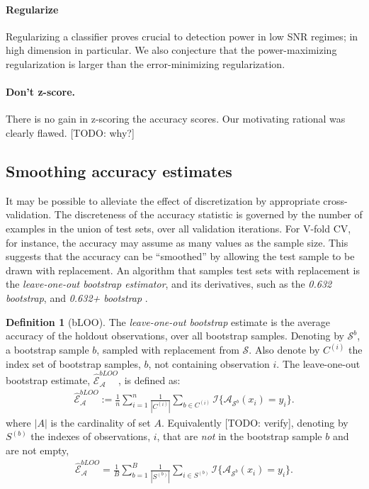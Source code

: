 \documentclass[12pt,a4paper]{article}
\theoremstyle{definition}
\newtheorem{definition}{Definition}
\newcommand{\set}[1]{\{ #1 \}} %
\newcommand{\indicator}[1]{\mathcal{I}{\set{#1}}} %
\newcommand{\features}{x} %
\newcommand{\outcomes}{y} %
\newcommand{\accEstim}{\hat{\mathcal{E}}}
\newcommand{\hypFun}[2]{\algo_{#1}(#2)} %
\newcommand{\algo}{\mathcal{A}}
\newcommand{\data}{\mathcal{S}}
\begin{document}
\paragraph{Regularize}
Regularizing a classifier proves crucial to detection power in low SNR regimes; in high dimension in particular. 
We also conjecture that the power-maximizing regularization is larger than the error-minimizing regularization. 

\paragraph{Don't z-score.} There is no gain in z-scoring the accuracy scores. Our motivating rational was clearly flawed. [TODO: why?]






\subsection{Smoothing accuracy estimates}
\label{sec:bootstrap}
It may be possible to alleviate the effect of discretization by appropriate cross-validation. 
The discreteness of the accuracy statistic is governed by the number of examples in the union of test sets, over all validation iterations.
For V-fold CV, for instance, the accuracy may assume as many values as the sample size. 
This suggests that the accuracy can be ``smoothed'' by allowing the test sample to be drawn with replacement. 
An algorithm that samples test sets with replacement is the \emph{leave-one-out bootstrap estimator},  and its derivatives, such as the \emph{0.632 bootstrap}, and \emph{0.632+ bootstrap} \citep[Sec 7.11]{hastie_elements_2003}.
\begin{definition}[bLOO]
\label{def:bloo}
The \emph{leave-one-out bootstrap} estimate is the average accuracy of the holdout observations, over all bootstrap samples. 
Denoting by $\data^b$, a bootstrap sample $b$, sampled with replacement from $\data$. 
Also denote by $C^{(i)}$ the index set of bootstrap samples, $b$, not containing observation $i$.
The leave-one-out bootstrap estimate, $\accEstim_{\algo}^{bLOO}$,  is defined as:
\begin{align}
		\accEstim_{\algo}^{bLOO}:= \frac 1n \sum_{i=1}^{n} \frac{1}{|C^{(i)}|} \sum_{b \in C^{(i)}} \indicator{\hypFun{\data^b}{\features_i}=\outcomes_i}.
\end{align}
where $|A|$ is the cardinality of set $A$.
Equivalently [TODO: verify], denoting by $S^{(b)}$ the indexes of observations, $i$, that are \emph{not} in the bootstrap sample $b$ and are not empty, 
\begin{align}
	\accEstim_{\algo}^{bLOO} = \frac 1B \sum_{b=1}^{B} \frac{1}{|S^{(b)}|} \sum_{i \in S^{(b)}} \indicator{\hypFun{\data^b}{\features_i}=\outcomes_i}.
\end{align}
\end{definition}
\end{document}
